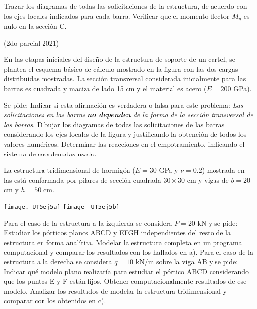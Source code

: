Trazar los diagramas de todas las solicitaciones de la estructura, de acuerdo con los ejes locales indicados para cada barra. Verificar que el momento flector $M_y$ es nulo en la sección C.




\ejercicio (2do parcial 2021)

En las etapas iniciales del diseño de la estructura de soporte de un cartel, se plantea el esquema básico de cálculo mostrado en la figura con las dos cargas distribuidas mostradas. La sección transversal  considerada inicialmente para las barras es cuadrada  y maciza de lado 15 cm y el material es acero ($E= 200$ GPa).

\begin{center}
	\def\svgwidth{0.8\textwidth}
	 
\end{center}

\vspace{1mm}

Se pide:
%
\parte Indicar si esta afirmación es verdadera o falsa para este problema: \textit{Las solicitaciones en las barras \textbf{no dependen} de la forma de la sección transversal de las barras}.
%
\parte Dibujar los diagramas de todas las solicitaciones de las barras considerando los ejes locales de la figura y justificando la obtención de todos los valores numéricos.
%
\parte Determinar las reacciones en el empotramiento, indicando el sistema de coordenadas usado.






\ejercicio

La estructura tridimensional de hormigón ($E=30$ GPa y $\nu=0.2$) mostrada en las está conformada por pilares de sección cuadrada $30 \times 30$ cm y vigas de $b=20$ cm y  $h=50$ cm.

\begin{center}
	\texttt{[image: UT5ej5a]}
	\hspace{0.05\linewidth}
	\texttt{[image: UT5ej5b]}
\end{center}

Para el caso de la estructura a la izquierda se considera $P=20$ kN y se pide:
%
\parte Estudiar los pórticos planos ABCD y EFGH independientes del resto de la estructura en forma analítica. 
%
\parte Modelar la estructura completa en un programa computacional y comparar  los resultados con los hallados en a). %
%
Para el caso de la estructura a la derecha se considera $q=10$ kN/m sobre la viga AB y se pide:
%
\parte Indicar qué modelo plano realizaría para estudiar el pórtico ABCD considerando que los puntos E y F están fijos. Obtener computacionalmente resultados de ese modelo. 
%
\parte Analizar los resultados de modelar la estructura tridimensional y comparar con los obtenidos en c). 







